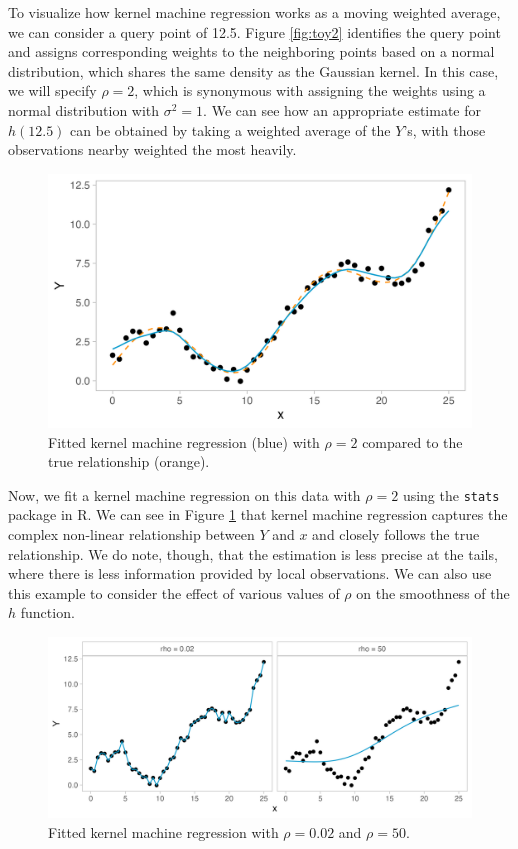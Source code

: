 \documentclass[12pt, twoside]{amherstthesis}
\begin{document}
To visualize how kernel machine regression works as a moving weighted average, we can consider a query point of 12.5. Figure \ref{fig:toy2} identifies the query point and assigns corresponding weights to the neighboring points based on a normal distribution, which shares the same density as the Gaussian kernel. In this case, we will specify \(\rho = 2\), which is synonymous with assigning the weights using a normal distribution with \(\sigma^2=1\). We can see how an appropriate estimate for \(h(12.5)\) can be obtained by taking a weighted average of the \(Y\)'s, with those observations nearby weighted the most heavily.
\begin{figure}

{\centering \includegraphics[width=0.75\linewidth]{figures/ch3_toy3} 

}

\caption{Fitted kernel machine regression (blue) with $\rho=2$ compared to the true relationship (orange).}\label{fig:toy3}
\end{figure}
Now, we fit a kernel machine regression on this data with \(\rho=2\) using the \texttt{stats} package in R. We can see in Figure \ref{fig:toy3} that kernel machine regression captures the complex non-linear relationship between \(Y\) and \(x\) and closely follows the true relationship. We do note, though, that the estimation is less precise at the tails, where there is less information provided by local observations. We can also use this example to consider the effect of various values of \(\rho\) on the smoothness of the \(h\) function.
\begin{figure}

{\centering \includegraphics[width=1\linewidth]{figures/ch3_toyrho} 

}

\caption{Fitted kernel machine regression with $\rho=0.02$ and $\rho=50$.}\label{fig:toyrho}
\end{figure}
\end{document}
